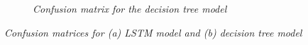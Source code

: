 \begin{figure}[hbt!]
\begin{subfigure}[b]{0.45\linewidth}
        \caption{\textit{Confusion matrix for the decision tree model}}
        \label{fig:figure12}
    \end{subfigure}
    \caption{\textit{Confusion matrices for (a) LSTM model and (b) decision tree model}}
    \label{fig:confusion_matrices}
    \vspace{-10pt}
\end{figure}